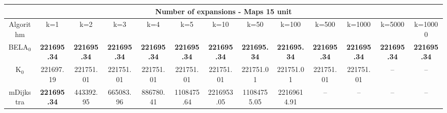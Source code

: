 \begin{tabular}{c|cccccccccccc}\toprule
\multicolumn{13}{c}{Number of expansions - Maps 15 unit}\\ \midrule
Algorithm & k=1 & k=2 & k=3 & k=4 & k=5 & k=10 & k=50 & k=100 & k=500 & k=1000 & k=5000 & k=10000 \\ \midrule
BELA$_0$ & \textbf{221695.34} & \textbf{221695.34} & \textbf{221695.34} & \textbf{221695.34} & \textbf{221695.34} & \textbf{221695.34} & \textbf{221695.34} & \textbf{221695.34} & \textbf{221695.34} & \textbf{221695.34} & \textbf{221695.34} & \textbf{221695.34} \\
K$_0$ & 221697.19 & 221751.01 & 221751.01 & 221751.01 & 221751.01 & 221751.01 & 221751.01 & 221751.01 & 221751.01 & 221751.01 & -- & -- \\
mDijkstra & \textbf{221695.34} & 443392.95 & 665083.96 & 886780.41 & 1108475.64 & 2216953.05 & 11084755.05 & 22169614.91 & -- & -- & -- & -- \\ \bottomrule 
\end{tabular}
